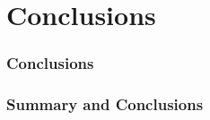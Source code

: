 \documentclass[10pt, pdf, xcolor=pdftex, dvipsnames, table]{beamer}
\begin{document}
\section[Conclusions]{Conclusions}

\begin{frame}
	\tableofcontents[currentsection]
\end{frame}

\begin{frame}
	\frametitle{Conclusions}
\end{frame}

\begin{frame}
	\frametitle{Summary and Conclusions}
\end{frame}

\end{document}

